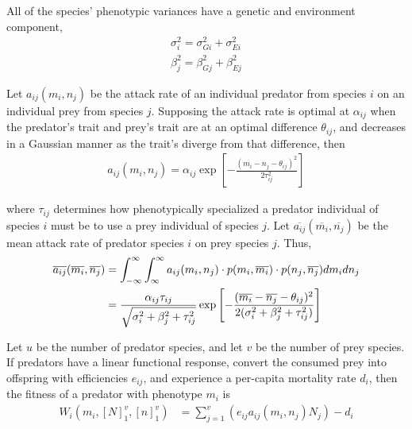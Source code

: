 \documentclass[10pt]{beamer}
\begin{document}
\noindent All of the species' phenotypic variances have a genetic and environment component,
\begin{align*}
	\sigma_i^2 = \sigma_{Gi}^2 + \sigma_{Ei}^2 \\
	\beta_j^2 = \beta_{Gj}^2 + \beta_{Ej}^2
\end{align*}

\noindent Let $a_{ij}(m_i, n_j)$ be the attack rate of an individual predator from species $i$ on an individual prey from species $j$.  Supposing the attack rate is optimal at $\alpha_{ij}$ when the predator's trait and prey's trait are at an optimal difference $\theta_{ij}$, and decreases in a Gaussian manner as the trait's diverge from that difference, then
\begin{align*}
	a_{ij}(m_i, n_j) = \alpha_{ij} \exp\left[{-\frac{(m_i - n_j - \theta_{ij})^2}{2\tau_{ij}^2}}\right]
\end{align*}

\noindent where $\tau_{ij}$ determines how phenotypically specialized a predator individual of species $i$ must be to use a prey individual of species $j$.  Let $\overline{a_{ij}}(\overline{m_i}, \overline{n_j})$ be the mean attack rate of predator species $i$ on prey species $j$.  Thus,
\begin{align*}
	\overline{a_{ij}}(\overline{m_i}, \overline{n_j}) &= \int_{-\infty}^{\infty}\int_{\-\infty}^{\infty} a_{ij}(m_i, n_j) \cdot p(m_i, \overline{m_i}) \cdot p(n_j, \overline{n_j}) dm_i dn_j \\
	&= \frac{\alpha_{ij}\tau_{ij}}{\sqrt{\sigma_i^2 + \beta_j^2 + \tau_{ij}^2}}\exp\left[{-\frac{(\overline{m_i} - \overline{n_j} - \theta_{ij})^2}{2(\sigma_i^2 + \beta_j^2 + \tau_{ij}^2)}}\right]
\end{align*}

\noindent Let $u$ be the number of predator species, and let $v$ be the number of prey species.  If predators have a linear functional response, convert the consumed prey into offspring with efficiencies $e_{ij}$, and experience a per-capita mortality rate $d_i$, then the fitness of a predator with phenotype $m_i$ is
\begin{align*}
	W_i(m_i, [N]_1^v, [n]_1^v) &= \sum_{j = 1}^v\left(e_{ij}a_{ij}(m_i, n_j)N_j\right) - d_i
\end{align*}
\end{document}
